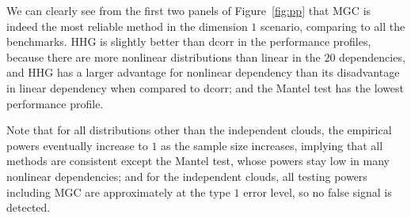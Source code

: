 \documentclass[11pt]{article}
\begin{document}
We can clearly see from the first two panels of Figure~\ref{fig:pp} that MGC is indeed the most reliable method in the dimension $1$ scenario, comparing to all the benchmarks. HHG is slightly better than dcorr in the performance profiles, because there are more nonlinear distributions than linear in the $20$ dependencies, and HHG has a larger advantage for nonlinear dependency than its disadvantage in linear dependency when compared to dcorr; and the Mantel test has the lowest performance profile. 

Note that for all distributions other than the independent clouds, the empirical powers eventually increase to $1$ as the sample size increases, implying that all methods are consistent except the Mantel test, whose powers stay low in many nonlinear dependencies; and for the independent clouds, all testing powers including MGC are approximately at the type $1$ error level, so no false signal is detected. %
\end{document}
